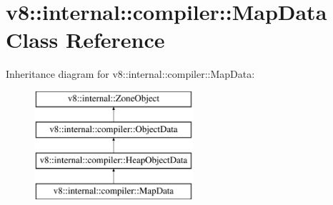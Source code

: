 \hypertarget{classv8_1_1internal_1_1compiler_1_1MapData}{}\section{v8\+:\+:internal\+:\+:compiler\+:\+:Map\+Data Class Reference}
\label{classv8_1_1internal_1_1compiler_1_1MapData}
Inheritance diagram for v8\+:\+:internal\+:\+:compiler\+:\+:Map\+Data\+:\begin{figure}[H]
\begin{center}
\leavevmode
\includegraphics[height=4.000000cm]{classv8_1_1internal_1_1compiler_1_1MapData}
\end{center}
\end{figure}
